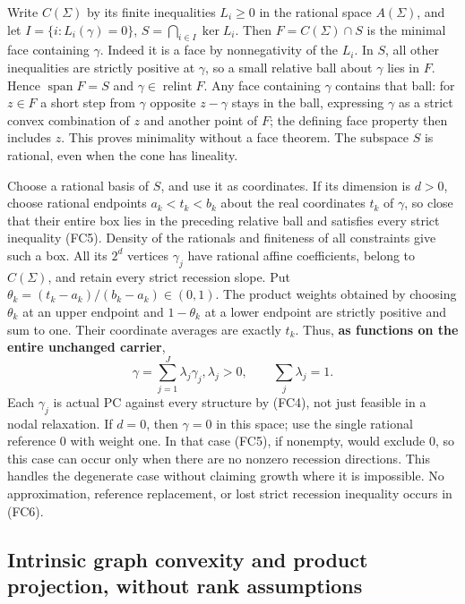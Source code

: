 \documentclass[
  11pt,
]{article}
\begin{document}
Write \(C(\Sigma)\) by its finite inequalities \(L_i\geq0\) in the
rational space \(A(\Sigma)\), and let \(I=\{i:L_i(\gamma)=0\}\),
\(S=\bigcap_{i\in I}\ker L_i\). Then \(F=C(\Sigma)\cap S\) is the
minimal face containing \(\gamma\). Indeed it is a face by nonnegativity
of the \(L_i\). In \(S\), all other inequalities are strictly positive
at \(\gamma\), so a small relative ball about \(\gamma\) lies in \(F\).
Hence \(\operatorname{span}F=S\) and
\(\gamma\in\operatorname{relint}F\). Any face containing \(\gamma\)
contains that ball: for \(z\in F\) a short step from \(\gamma\) opposite
\(z-\gamma\) stays in the ball, expressing \(\gamma\) as a strict convex
combination of \(z\) and another point of \(F\); the defining face
property then includes \(z\). This proves minimality without a face
theorem. The subspace \(S\) is rational, even when the cone has
lineality.

Choose a rational basis of \(S\), and use it as coordinates. If its
dimension is \(d>0\), choose rational endpoints \(a_k<t_k<b_k\) about
the real coordinates \(t_k\) of \(\gamma\), so close that their entire
box lies in the preceding relative ball and satisfies every strict
inequality (FC5). Density of the rationals and finiteness of all
constraints give such a box. All its \(2^d\) vertices \(\gamma_j\) have
rational affine coefficients, belong to \(C(\Sigma)\), and retain every
strict recession slope. Put \(\theta_k=(t_k-a_k)/(b_k-a_k)\in(0,1)\).
The product weights obtained by choosing \(\theta_k\) at an upper
endpoint and \(1-\theta_k\) at a lower endpoint are strictly positive
and sum to one. Their coordinate averages are exactly \(t_k\). Thus,
\textbf{as functions on the entire unchanged carrier}, \[
                 \gamma=\sum_{j=1}^{J}\lambda_j\gamma_j,
                 \lambda_j>0,\qquad\sum_j\lambda_j=1.        \tag{FC6}
\] Each \(\gamma_j\) is actual PC against every structure by (FC4), not
just feasible in a nodal relaxation. If \(d=0\), then \(\gamma=0\) in
this space; use the single rational reference \(0\) with weight one. In
that case (FC5), if nonempty, would exclude \(0\), so this case can
occur only when there are no nonzero recession directions. This handles
the degenerate case without claiming growth where it is impossible. No
approximation, reference replacement, or lost strict recession
inequality occurs in (FC6).

\subsection{Intrinsic graph convexity and product projection, without
rank
assumptions}\label{intrinsic-graph-convexity-and-product-projection-without-rank-assumptions}
\end{document}
